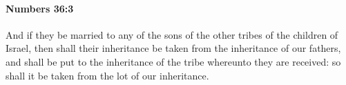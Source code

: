 
		\paragraph{Numbers 36:3} %
			\label{NUMBERS-36-3}

			And if they be married to any of the sons of the other tribes of the children of Israel, then shall their inheritance be taken from the inheritance of our fathers, and shall be put to the inheritance of the tribe whereunto they are received: so shall it be taken from the lot of our inheritance.


